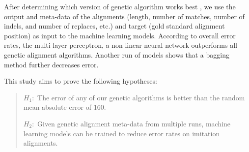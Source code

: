 After determining which version of genetic algorithm works best , we use the output and meta-data of the alignments (length, number of matches, number of indels, and number of replaces, etc.) and target (gold standard alignment position) as input to the machine learning models. %
According to overall error rates, the multi-layer perceptron, a non-linear neural network outperforms all genetic alignment algorithms. Another run of models shows that a bagging method further decreases error. %

This study aims to prove the following hypotheses:
	\begin{quote}
		$H_{1}:$ The error of any of our genetic algorithms is better than the random mean absolute error of $160$.

		$H_{2}:$ Given genetic alignment meta-data from multiple runs, machine learning models can be trained to reduce error rates on imitation alignments.
		
	\end{quote}

